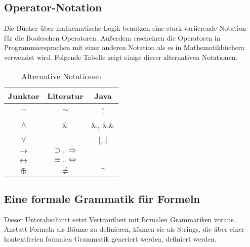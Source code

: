 \subsection{Operator-Notation}\label{subsec:Notation}
Die Bücher über mathematische Logik benutzen eine stark variierende Notation für die Booleschen Operatoren. Außerdem erscheinen die Operatoren in Programmiersprachen mit einer anderen Notation als es in Mathematikbüchern verwendet wird. Folgende Tabelle zeigt einige dieser alternativen Notationen.

\begin{table}[h]

			\begin{center}
			\begin{tabular}{ccc}
			\hline
			\textbf{Junktor} & \textbf{Literatur} & \textbf{Java}\\
			\hline
			\hline
			$\neg$ &$\sim$& !\\
			\hline
			$\wedge$  & \& & \&, \&\&  \\
			\hline
			$\vee$ &  & |,||\\
			\hline
			$\rightarrow$  & $\supset,\Rightarrow$ & \\
			\hline
			$\leftrightarrow$ & $\equiv,\Leftrightarrow$ & \\
			\hline
			$\oplus$ &$\not\equiv$ &$\mbox{\textasciicircum}$ \\
			\hline
			\end{tabular}
			\end{center}
			\caption[Notationen der Booleschen Operatoren]{Alternative Notationen\cite{Ben-Ari}}
			\label{Notationen}
			\end{table}
			
\subsection{Eine formale Grammatik für Formeln}\label{subsec:FormelGrammatik}


Dieser Unterabschnitt setzt Vertrautheit mit formalen Grammatiken voraus. Anstatt Formeln als Bäume zu definieren, können sie als Strings, die über einer kontextfreien formalen Grammatik generiert werden, definiert werden.

